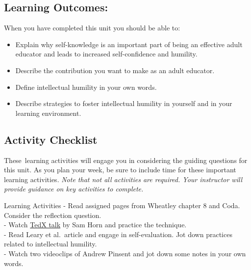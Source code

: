 \documentclass[
]{book}
\providecommand{\tightlist}{%
  \setlength{\itemsep}{0pt}\setlength{\parskip}{0pt}}
\begin{document}
\hypertarget{learning-outcomes-8}{%
\subsection*{Learning Outcomes:}\label{learning-outcomes-8}}

When you have completed this unit you should be able to:

\begin{itemize}
\tightlist
\item
  Explain why self-knowledge is an important part of being an effective adult educator and leads to increased self-confidence and humility.\\
\item
  Describe the contribution you want to make as an adult educator.\\
\item
  Define intellectual humility in your own words.\\
\item
  Describe strategies to foster intellectual humility in yourself and in your learning environment.
\end{itemize}

\hypertarget{activity-checklist-8}{%
\subsection*{Activity Checklist}\label{activity-checklist-8}}

These~learning activities will engage you in considering the guiding questions for this unit. As you plan your week, be sure to include time for these important learning activities. \emph{Note that not all activities are required. Your instructor will provide guidance on key activities to complete.}

\begin{reflect}
{Learning Activities} - Read assigned pages from Wheatley chapter 8 and
Coda. Consider the reflection question.\\
- Watch \href{https://youtu.be/Xlg8zdSVjgg}{TedX talk} by Sam Horn and
practice the technique.\\
- Read Leary et al.~article and engage in self-evaluation. Jot down
practices related to intellectual humility.\\
- Watch two videoclips of Andrew Pinsent and jot down some notes in your
own words.
\end{reflect}
\end{document}
